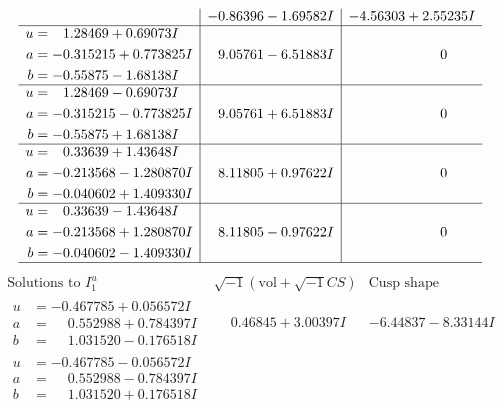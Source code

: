 \documentclass[1p]{elsarticle_modified}
\theoremstyle{definition}
\newcommand{\I}{\sqrt{-1}}
\begin{document}
$$\begin{array}{c|c|c}
 & -0.86396 - 1.69582 I & -4.56303 + 2.55235 I \\ \hline\begin{aligned}
u &= \phantom{-}1.28469 + 0.69073 I \\
a &= -0.315215 + 0.773825 I \\
b &= -0.55875 - 1.68138 I\end{aligned}
 & \phantom{-}9.05761 - 6.51883 I & \phantom{-0.000000 } 0 \\ \hline\begin{aligned}
u &= \phantom{-}1.28469 - 0.69073 I \\
a &= -0.315215 - 0.773825 I \\
b &= -0.55875 + 1.68138 I\end{aligned}
 & \phantom{-}9.05761 + 6.51883 I & \phantom{-0.000000 } 0 \\ \hline\begin{aligned}
u &= \phantom{-}0.33639 + 1.43648 I \\
a &= -0.213568 - 1.280870 I \\
b &= -0.040602 + 1.409330 I\end{aligned}
 & \phantom{-}8.11805 + 0.97622 I & \phantom{-0.000000 } 0 \\ \hline\begin{aligned}
u &= \phantom{-}0.33639 - 1.43648 I \\
a &= -0.213568 + 1.280870 I \\
b &= -0.040602 - 1.409330 I\end{aligned}
 & \phantom{-}8.11805 - 0.97622 I & \phantom{-0.000000 } 0\\
 \hline 
 \end{array}$$\newpage$$\begin{array}{c|c|c}  
\text{Solutions to }I^u_{1}& \I (\text{vol} + \sqrt{-1}CS) & \text{Cusp shape}\\
 \hline 
\begin{aligned}
u &= -0.467785 + 0.056572 I \\
a &= \phantom{-}0.552988 + 0.784397 I \\
b &= \phantom{-}1.031520 - 0.176518 I\end{aligned}
 & \phantom{-}0.46845 + 3.00397 I & -6.44837 - 8.33144 I \\ \hline\begin{aligned}
u &= -0.467785 - 0.056572 I \\
a &= \phantom{-}0.552988 - 0.784397 I \\
b &= \phantom{-}1.031520 + 0.176518 I\end{aligned}

\end{array}$$
\end{document}
